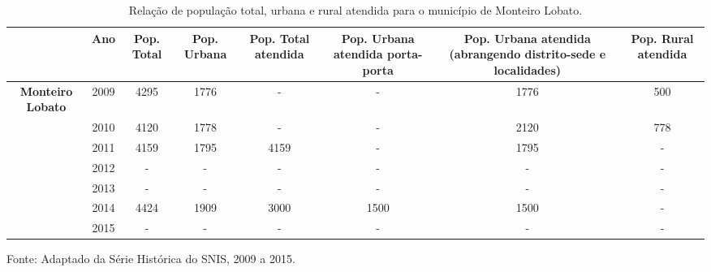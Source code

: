 \begin{table}[htbp!]
\caption{Relação de população total, urbana e rural atendida para o município de Monteiro Lobato.}
\begin{center}
\begin{tabular}{|c|c|c|c|c|c|c|c|}
\hline
\textbf{} & \textbf{Ano} & \textbf{Pop. Total} & \textbf{Pop. Urbana} & \textbf{Pop. Total atendida} & \textbf{Pop. Urbana atendida porta-porta} & \textbf{Pop. Urbana atendida (abrangendo distrito-sede e localidades)} & \textbf{Pop. Rural atendida} \\ \hline
\textbf{Monteiro Lobato} & 2009 & 4295 & 1776 & - & - & 1776 & 500 \\ \hline
\textbf{} & 2010 & 4120 & 1778 & - & - & 2120 & 778 \\ \hline
\textbf{} & 2011 & 4159 & 1795 & 4159 & - & 1795 & - \\ \hline
\textbf{} & 2012 & - & - & - & - & - & - \\ \hline
\textbf{} & 2013 & - & - & - & - & - & - \\ \hline
\textbf{} & 2014 & 4424 & 1909 & 3000 & 1500 & 1500 & - \\ \hline
\textbf{} & 2015 & - & - & - & - & - & - \\ \hline
\end{tabular}
Fonte: Adaptado da Série Histórica do SNIS, 2009 a 2015.
\end{center}
\label{tab:pop_coleta}
\end{table}
